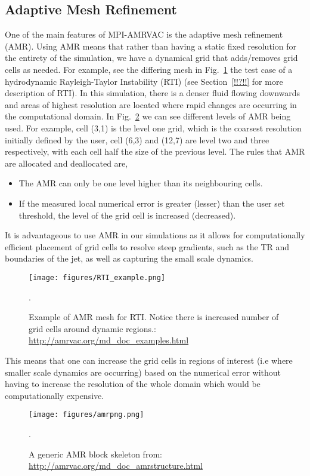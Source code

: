 \documentclass[12pt]{ociamthesis}
\begin{document}
\subsection{Adaptive Mesh Refinement}
\label{ssec:amr}
One of the main features of MPI-AMRVAC is the adaptive mesh refinement (AMR). Using AMR means that rather than having a static fixed resolution for the entirety of the simulation, we have a dynamical grid that adds/removes grid cells as needed. For example, see the differing mesh in Fig.~\ref{amr_example} the test case of a hydrodynamic Rayleigh-Taylor Instability (RTI) (see Section~\ref{!!?!!} for more description of RTI). In this simulation, there is a denser fluid flowing downwards and areas of highest resolution are located where rapid changes are occurring in the computational domain. In Fig.~\ref{amr_scheme} we can see different levels of AMR being used. For example, cell (3,1) is the level one grid, which is the coarsest resolution initially defined by the user, cell (6,3) and (12,7) are level two and three respectively, with each cell half the size of the previous level. The rules that AMR are allocated and deallocated are,
\begin{itemize}
    \item The AMR can only be one level higher than its neighbouring cells.
    \item If the measured local numerical error is greater (lesser) than the user set threshold, the level of the grid cell is increased (decreased).
\end{itemize}
It is advantageous to use AMR in our simulations as it allows for computationally efficient placement of grid cells to resolve steep gradients, such as the TR and boundaries of the jet, as well as capturing the small scale dynamics.  
\begin{figure}
\centering
\texttt{[image: figures/RTI\_example.png]}
\caption{Example of AMR mesh for RTI. Notice there is increased number of grid cells around dynamic regions.: \url{http://amrvac.org/md_doc_examples.html}}.
\label{amr_example}
\end{figure}   
This means that one can increase the grid cells in regions of interest (i.e where smaller scale dynamics are occurring) based on the numerical error without having to increase the resolution of the whole domain which would be computationally expensive.
\begin{figure}
\centering
\texttt{[image: figures/amrpng.png]}
\caption{A generic AMR block skeleton from: \url{http://amrvac.org/md_doc_amrstructure.html}}.
\label{amr_scheme}
\end{figure}   
\end{document}
